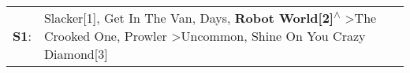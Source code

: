 \begin{supertabular}{p{0.03\textwidth}p{0.92\textwidth}}
 \textbf{S1}:  &  Slacker[1]\textsuperscript{}, \enspace Get In The Van\textsuperscript{},  Days\textsuperscript{}, \enspace \textbf{Robot World[2]\textsuperscript{$\wedge$}} \textgreater \enspace The Crooked One\textsuperscript{}, \enspace Prowler\textsuperscript{} \textgreater \enspace Uncommon\textsuperscript{}, \enspace Shine On You Crazy Diamond[3]\textsuperscript{}  \enspace  \\
\end{supertabular}
